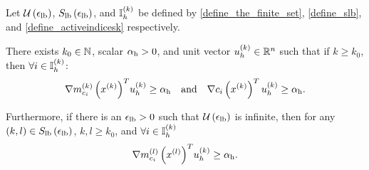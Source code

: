 \begin{lemma}
\label{yet_another_bound_on_a_u}

Let ${\mathcal U\left(\epsilon_{\textrm{lb}}\right)}$, ${S_{\textrm{lb}}\left(\epsilon_{\textrm{lb}}\right)}$, and ${ \mathbb I_h^{(k)} }$ be defined by \cref{define_the_finite_set}, \cref{define_slb}, and \cref{define_activeindicesk} respectively.



There exists $k_0 \in \mathbb N$, scalar ${ \alpha_{\textrm{h}} } > 0$, and unit vector ${ u_{h}^{(k)} } \in \mathbb R^n$ such that if 
$k \ge k_0$, then $\forall i \in { \mathbb I_h^{(k)} }$:
\begin{align*}
{\nabla m_{c_i}^{(k)}\left(x^{(k)}\right)}^T { u_{h}^{(k)} } \ge { \alpha_{\textrm{h}} }
\quad \textrm{and} \quad
\nabla c_i\left(x^{(k)}\right)^T { u_{h}^{(k)} } \ge { \alpha_{\textrm{h}} }.
\end{align*}

Furthermore, if there is an ${\epsilon_{\textrm{lb}}} > 0$ such that ${\mathcal U\left(\epsilon_{\textrm{lb}}\right)}$ is infinite, then for any $(k, l) \in {S_{\textrm{lb}}\left(\epsilon_{\textrm{lb}}\right)}$, $k,l \ge k_0$, and $\forall i \in { \mathbb I_h^{(k)} }$
\begin{align*}
{\nabla m_{c_i}^{(l)}\left({x^{(l)}}\right)}^T { u_{h}^{(k)} } \ge { \alpha_{\textrm{h}} }.
\end{align*}
\end{lemma}
